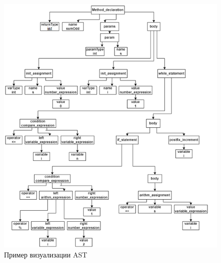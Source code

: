\newpage
\begin{figure}[h]
	\center
	\includegraphics [scale=1] {my_folder/images/my/2}
	\caption{Пример визуализации AST}
	\label{fig:2}  
\end{figure}

